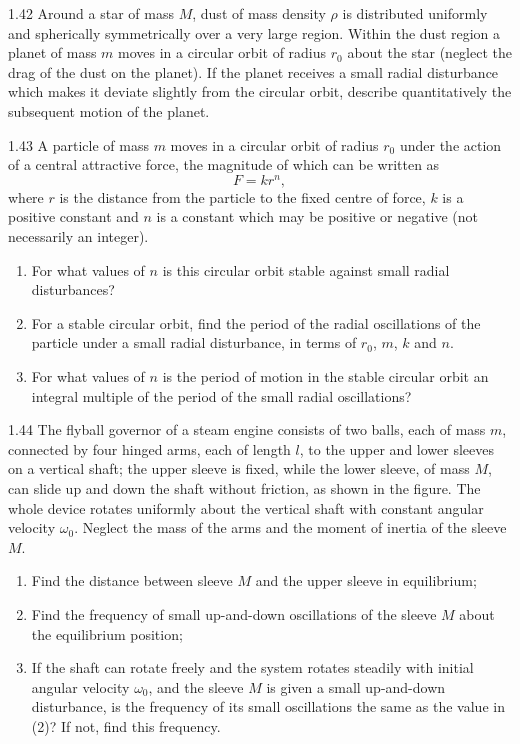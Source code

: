 \begin{problem}{1.42}
Around a star of mass $M$, dust of mass density $\rho$ is distributed uniformly and spherically symmetrically over a very large region. Within the dust region a planet of mass $m$ moves in a circular orbit of radius $r_0$ about the star (neglect the drag of the dust on the planet). If the planet receives a small radial disturbance which makes it deviate slightly from the circular orbit, describe quantitatively the subsequent motion of the planet.
\end{problem}

\begin{problem}{1.43}
A particle of mass $m$ moves in a circular orbit of radius $r_0$ under the action of a central attractive force, the magnitude of which can be written as
\[
F=kr^{n},
\]
where $r$ is the distance from the particle to the fixed centre of force, $k$ is a positive constant and $n$ is a constant which may be positive or negative (not necessarily an integer).
\begin{enumerate}[label=(\arabic*),leftmargin=2.2em,itemsep=1pt,topsep=2pt]
\item For what values of $n$ is this circular orbit stable against small radial disturbances?
\item For a stable circular orbit, find the period of the radial oscillations of the particle under a small radial disturbance, in terms of $r_0$, $m$, $k$ and $n$.
\item For what values of $n$ is the period of motion in the stable circular orbit an integral multiple of the period of the small radial oscillations?
\end{enumerate}
\end{problem}

\begin{problem}{1.44}
The flyball governor of a steam engine consists of two balls, each of mass $m$, connected by four hinged arms, each of length $l$, to the upper and lower sleeves on a vertical shaft; the upper sleeve is fixed, while the lower sleeve, of mass $M$, can slide up and down the shaft without friction, as shown in the figure. The whole device rotates uniformly about the vertical shaft with constant angular velocity $\omega_0$. Neglect the mass of the arms and the moment of inertia of the sleeve $M$.
\begin{enumerate}[label=(\arabic*),leftmargin=2.2em,itemsep=1pt,topsep=2pt]
\item Find the distance between sleeve $M$ and the upper sleeve in equilibrium;
\item Find the frequency of small up-and-down oscillations of the sleeve $M$ about the equilibrium position;
\item If the shaft can rotate freely and the system rotates steadily with initial angular velocity $\omega_0$, and the sleeve $M$ is given a small up-and-down disturbance, is the frequency of its small oscillations the same as the value in (2)? If not, find this frequency.
\end{enumerate}
\end{problem}

